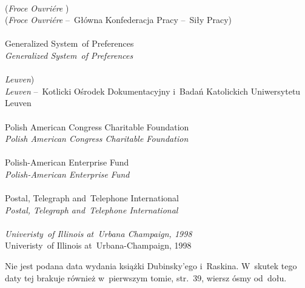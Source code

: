 \documentclass[a4paper,11pt]{article}
\begin{document}
 \\
\Jest (\emph{Froce Ouvri\'{e}re} ) \\
\Pow (\emph{Froce Ouvri\'{e}re} --~Główna Konfederacja Pracy --~Siły
Pracy) \\
 \\
\Jest Generalized System~of Preferences \\
\Pow  \emph{Generalized System~of Preferences} \\
 \\
\Jest \emph{Leuven}) \\
\Pow \emph{Leuven} --~Kotlicki Ośrodek Dokumentacyjny i~Badań
Katolickich Uniwersytetu Leuven \\
 \\
\Jest Polish American Congress Charitable Foundation \\
\Pow  \emph{Polish American Congress Charitable Foundation} \\
 \\
\Jest Polish-American Enterprise Fund \\
\Pow  \emph{Polish-American Enterprise Fund} \\
 \\
\Jest Postal, Telegraph and~Telephone International \\
\Pow  \emph{Postal, Telegraph and~Telephone International} \\
 \\
\Jest \emph{Univeristy~of Illinois at~Urbana Champaign, 1998} \\
\Pow  Univeristy~of Illinois at~Urbana-Champaign, 1998 \\

\vspace{\spaceTwo}








\start {} Nie jest podana data wydania książki
Dubinsky'ego i~Raskina. W~skutek tego daty tej brakuje również
w~pierwszym tomie, str.~39, wiersz ósmy od~dołu.
\end{document}
